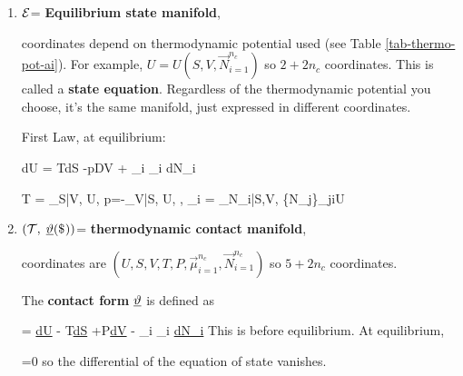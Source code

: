 \begin{enumerate}
\beq P(x|\theta +d\theta)\approx
{}P(x|\theta)
\eeq
Let $P(x|\theta)=\calp$. Consider the 
single parameter case for simplicity.

\beq
\ln (1+ R)= R -
+\calo(R^3)
\eeq

\beq
\Delta \calp=
d\theta \partial_\theta \calp + \calo((d\theta)^2)
\eeq

\beq
\calp \ln\frac{\calp}{\calp + \Delta \calp}=
-\calp \ln\left(1+\frac{\Delta \calp}{\calp}\right)
\approx -\calp \frac{\Delta\calp}{\calp}
\left(
1-\frac{\Delta\calp}{2\calp}
\right)
\eeq

\beq
D_{KL}\approx
\int dx\
\eeq

\beq
\int dx\;\Delta \calp =
\int dx\; d\theta \partial_\theta \calp
=
d\theta \partial_\theta 
{}_{1}=0
\eeq

\beq
D_{KL}=
_{\metric^F}
\eeq
\qed


\item
${\cal E}$= {\bf Equilibrium state manifold},

coordinates depend on thermodynamic potential used
(see Table \ref{tab-thermo-pot-ai}). For example, $U=U(S, V, \vec{N}_{i=1}^{n_c})$ so $2 + 2n_c$ coordinates.
This is called a {\bf state equation}. Regardless of the thermodynamic potential you choose, it's the same manifold,
just expressed in different coordinates.

First Law, at equilibrium:

\beq
dU = TdS -pDV + \sum_i \mu_i dN_i
\eeq

\beq
T = \partial_{S|V, }U,\quad
p=-\partial_{V|S, \vec{N}}U,
,\quad
\mu_i =
\partial_{N_i|S,V, \{N_j\}_{j\neq i}}U
\eeq

\item
$(\calt, \pform{\vartheta}{})$= {\bf thermodynamic contact manifold},

coordinates are $(U, S, V, T, P, \vec{\mu}_{i=1}^{n_c}, \vec{N}_{i=1}^{n_c})$ so  $5 +2n_c$  coordinates.

The {\bf contact form } $\ul{\vartheta}$ is defined as

\beq
\ul{\vartheta}= \ul{dU}  - T\ul{dS}
+P\ul{dV}
-
\sum_i \mu_i \ul{dN_i}
\eeq
This is before equilibrium. At equilibrium,

\beq
\AT{\ul{\vartheta}}{\cale}=0
\eeq
so the differential
of  the equation of state vanishes.
\end{enumerate}









